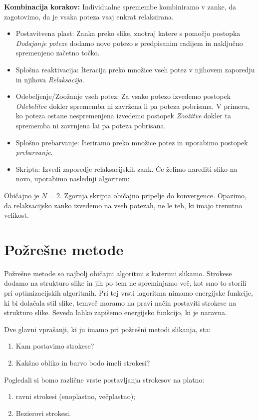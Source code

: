 %
\textbf{Kombinacija korakov:} Individualne spremembe kombiniramo v zanke, da zagotovimo, da je vsaka poteza vsaj enkrat relaksirana.
%
\begin{itemize}
  \item Postavitvena plast: Zanka preko slike, znotraj katere s pomočjo postopka \textit{Dodajanje poteze} dodamo novo potezo s predpisanim radijem in naključno spremenjeno začetno točko.
  \item Splošna reaktivacija: Iteracija preko množice vseh potez v njihovem zaporedju in njihova \textit{Relaksacija}.
  \item Odebeljenje/Zoožanje vseh potez: Za vsako potezo izvedemo postopek \textit{Odebelitve} dokler sprememba ni zavržena li pa poteza pobrisana. V primeru, ko poteza ostane nespremenjena izvedemo postopek \textit{Zoožitve} dokler ta sprememba ni zavrnjena lai pa poteza pobrisana.
  \item Splošno prebarvanje: Iteriramo preko množice potez in uporabimo postopek \textit{prebarvanje}.
  \item Skripta: Izvedi zaporedje relaksacijskih zank. Če želimo narediti sliko na novo, uporabimo naslednji algoritem:
\end{itemize}
%
Običajno je $N=2$. Zgornja skripta običajno pripelje do konvergence. Opazimo, da relaksacijsko zanko izvedemo na vseh potezah, ne le teh, ki imajo trenutno velikost.
\section{Požrešne metode}
Požrešne metode so najbolj običajni algoritmi s katerimi slikamo. Strokese dodamo na strukturo slike in jih po tem ne spreminjamo več, kot smo to storili pri optimizacijskih algoritmih. Pri tej vrsti lagoritma nimamo energijske funkcije, ki bi dolačala stil slike, temveč moramo na pravi način postaviti strokese na strukturo slike. Seveda lahko zapišemo energijsko funkcijo, ki je naravna.

Dve glavni vprašanji, ki ju imamo pri požrešni metodi slikanja, sta:
%
\begin{enumerate}
\item Kam postavimo strokese?
\item Kakšno obliko in barvo bodo imeli strokesi?
\end{enumerate}
%
Pogledali si bomo različne vrste postavljanja strokesov na platno:
%
\begin{enumerate}
\item ravni strokesi (enoplastno, večplastno);
\item Bezierovi strokesi.
\end{enumerate}
%
